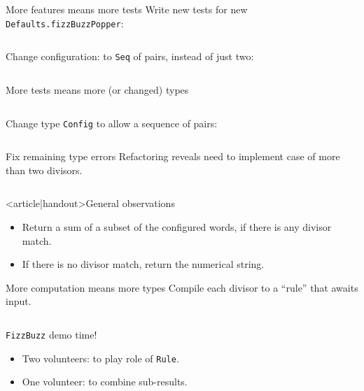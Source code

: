 \begin{frame}[fragile]{More features means more tests}
  Write new tests for new \texttt{Defaults.fizzBuzzPopper}:

  \inputminted[gobble=2]{scala}{FizzBuzzSpec5.scala}

  Change configuration: to \texttt{Seq} of pairs, instead of just two:
  \inputminted[gobble=2]{scala}{Defaults2.scala}
\end{frame}

\begin{frame}[fragile]{More tests means more (or changed) types}
  \inputminted{console}{testQuick8.console}

  Change \alert{type} \texttt{Config} to allow a sequence of pairs:

  \inputminted[gobble=2]{scala}{FizzBuzz3Seq.scala}

\end{frame}

\begin{frame}[fragile]{Fix remaining type errors}
  Refactoring reveals need to implement case of more than two divisors.

  \inputminted[gobble=2]{scala}{FizzBuzz3SeqCompile.scala}
\end{frame}

\begin{frame}<article|handout>{General observations}
  \begin{itemize}
  \item Return a sum of a subset of the configured words, if there is any divisor match.
  \item If there is \alert{no} divisor match, return the numerical string.
  \end{itemize}
\end{frame}

\begin{frame}[fragile]{More computation means more types}
  Compile each divisor to a ``rule'' that awaits input.

  \inputminted[gobble=2]{scala}{FizzBuzz4.scala}

  \begin{block}{\texttt{FizzBuzz} demo time!}
    \begin{itemize}
    \item Two volunteers: to play role of \texttt{Rule}.
    \item One volunteer: to combine sub-results.
    \end{itemize}
  \end{block}
\end{frame}

